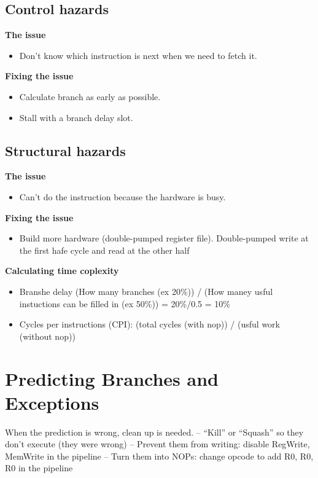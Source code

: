 \subsection{Control hazards}
\textbf{The issue}
\begin{itemize}
\item  Don’t know which instruction is next when we need to fetch it.
\end{itemize}

\textbf{Fixing the issue}
\begin{itemize}
\item  Calculate branch as early as possible.
\item  Stall with a branch delay slot.
\end{itemize}


\subsection{Structural hazards}
\textbf{The issue}
\begin{itemize}
\item  Can’t do the instruction because the hardware is busy.  
\end{itemize}

\textbf{Fixing the issue}
\begin{itemize}
\item  Build more hardware (double-pumped register file).
  Double-pumped write at the first hafe cycle and read at the other half
\end{itemize}

\textbf{Calculating time coplexity}
\begin{itemize}
\item  Branshe delay \newline
  (How many branches (ex 20\%)) / (How maney usful instuctions can be filled in (ex 50\%))
  = 20\%/0.5 = 10\%
\item  Cycles per instructions (CPI): (total cycles (with nop)) / (usful work (without nop))
\end{itemize}


\newpage


\section{Predicting Branches and Exceptions}
When the prediction is wrong, clean up is needed.
– “Kill” or “Squash” so they don’t execute (they were wrong)
– Prevent them from writing: disable RegWrite, MemWrite in the pipeline
– Turn them into NOPs: change opcode to add R0, R0, R0 in the pipeline


